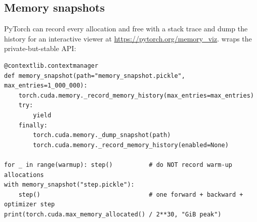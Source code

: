 \subsection{Memory snapshots}

PyTorch can record every allocation and free with a stack trace and dump the history for an
interactive viewer at \url{https://pytorch.org/memory_viz}. 
wraps the private-but-stable API:

\begin{lstlisting}[caption={Recording an allocator history for the memory viewer.},label={lst:perf:snapshot}]
@contextlib.contextmanager
def memory_snapshot(path="memory_snapshot.pickle", max_entries=1_000_000):
    torch.cuda.memory._record_memory_history(max_entries=max_entries)
    try:
        yield
    finally:
        torch.cuda.memory._dump_snapshot(path)
        torch.cuda.memory._record_memory_history(enabled=None)

for _ in range(warmup): step()          # do NOT record warm-up allocations
with memory_snapshot("step.pickle"):
    step()                              # one forward + backward + optimizer step
print(torch.cuda.max_memory_allocated() / 2**30, "GiB peak")
\end{lstlisting}

